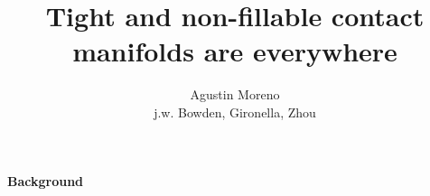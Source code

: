 \documentclass{beamer}
\title[] %
{Tight and non-fillable contact manifolds are everywhere}
\subtitle
{}
\author[Agustin Moreno] %
{Agustin Moreno \\ j.w. Bowden, Gironella, Zhou}
\institute%
{Heidelberg University}
\date[UCLA] %
\newtheorem{conjecture}{Conjecture}
\begin{document}
\begin{frame}
  \titlepage
\end{frame}












    

\begin{frame}
\begin{tcolorbox}
\Huge \begin{center}
    \textbf{Background}
\end{center}
\end{tcolorbox}
\end{frame}
\end{document}
